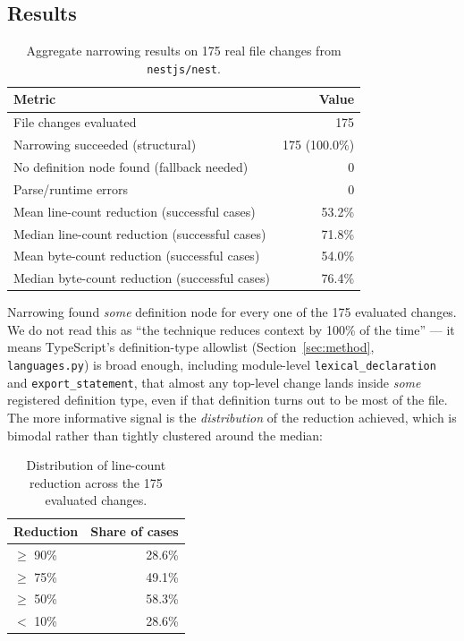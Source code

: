 \documentclass[11pt]{article}
\newcommand{\code}[1]{\texttt{#1}}
\begin{document}
\subsection{Results}

\begin{table}[h]
\centering
\begin{tabular}{lr}
\toprule
\textbf{Metric} & \textbf{Value} \\
\midrule
File changes evaluated & 175 \\
Narrowing succeeded (structural) & 175 (100.0\%) \\
No definition node found (fallback needed) & 0 \\
Parse/runtime errors & 0 \\
Mean line-count reduction (successful cases) & 53.2\% \\
Median line-count reduction (successful cases) & 71.8\% \\
Mean byte-count reduction (successful cases) & 54.0\% \\
Median byte-count reduction (successful cases) & 76.4\% \\
\bottomrule
\end{tabular}
\caption{Aggregate narrowing results on 175 real file changes from \code{nestjs/nest}.}
\label{tab:results}
\end{table}

Narrowing found \emph{some} definition node for every one of the 175 evaluated
changes. We do not read this as ``the technique reduces context by 100\% of the
time'' --- it means TypeScript's definition-type allowlist
(Section~\ref{sec:method}, \code{languages.py}) is broad enough, including
module-level \code{lexical\_declaration} and \code{export\_statement}, that almost
any top-level change lands inside \emph{some} registered definition type, even if
that definition turns out to be most of the file. The more informative signal is
the \emph{distribution} of the reduction achieved, which is bimodal rather than
tightly clustered around the median:

\begin{table}[h]
\centering
\begin{tabular}{lr}
\toprule
\textbf{Reduction} & \textbf{Share of cases} \\
\midrule
$\geq$ 90\% & 28.6\% \\
$\geq$ 75\% & 49.1\% \\
$\geq$ 50\% & 58.3\% \\
$<$ 10\% & 28.6\% \\
\bottomrule
\end{tabular}
\caption{Distribution of line-count reduction across the 175 evaluated changes.}
\label{tab:distribution}
\end{table}
\end{document}
